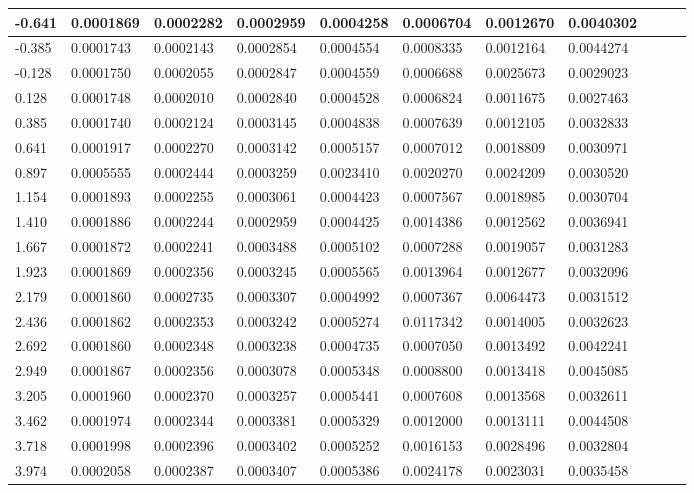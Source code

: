 \documentclass{article}
\begin{document}
\begin{table}[H]
\begin{adjustwidth}{-0.5in}{-.7in}
\begin{tabular}{|l|l|l|l|l|l|l|l|l|l|l|}
-0.641 & 0.0001869 & 0.0002282 & 0.0002959 & 0.0004258 & 0.0006704 & 0.0012670 & 0.0040302 \\ \hline
-0.385 & 0.0001743 & 0.0002143 & 0.0002854 & 0.0004554 & 0.0008335 & 0.0012164 & 0.0044274 \\ \hline
-0.128 & 0.0001750 & 0.0002055 & 0.0002847 & 0.0004559 & 0.0006688 & 0.0025673 & 0.0029023 \\ \hline
0.128 & 0.0001748 & 0.0002010 & 0.0002840 & 0.0004528 & 0.0006824 & 0.0011675 & 0.0027463 \\ \hline
0.385 & 0.0001740 & 0.0002124 & 0.0003145 & 0.0004838 & 0.0007639 & 0.0012105 & 0.0032833 \\ \hline
0.641 & 0.0001917 & 0.0002270 & 0.0003142 & 0.0005157 & 0.0007012 & 0.0018809 & 0.0030971 \\ \hline
0.897 & 0.0005555 & 0.0002444 & 0.0003259 & 0.0023410 & 0.0020270 & 0.0024209 & 0.0030520 \\ \hline
1.154 & 0.0001893 & 0.0002255 & 0.0003061 & 0.0004423 & 0.0007567 & 0.0018985 & 0.0030704 \\ \hline
1.410 & 0.0001886 & 0.0002244 & 0.0002959 & 0.0004425 & 0.0014386 & 0.0012562 & 0.0036941 \\ \hline
1.667 & 0.0001872 & 0.0002241 & 0.0003488 & 0.0005102 & 0.0007288 & 0.0019057 & 0.0031283 \\ \hline
1.923 & 0.0001869 & 0.0002356 & 0.0003245 & 0.0005565 & 0.0013964 & 0.0012677 & 0.0032096 \\ \hline
2.179 & 0.0001860 & 0.0002735 & 0.0003307 & 0.0004992 & 0.0007367 & 0.0064473 & 0.0031512 \\ \hline
2.436 & 0.0001862 & 0.0002353 & 0.0003242 & 0.0005274 & 0.0117342 & 0.0014005 & 0.0032623 \\ \hline
2.692 & 0.0001860 & 0.0002348 & 0.0003238 & 0.0004735 & 0.0007050 & 0.0013492 & 0.0042241 \\ \hline
2.949 & 0.0001867 & 0.0002356 & 0.0003078 & 0.0005348 & 0.0008800 & 0.0013418 & 0.0045085 \\ \hline
3.205 & 0.0001960 & 0.0002370 & 0.0003257 & 0.0005441 & 0.0007608 & 0.0013568 & 0.0032611 \\ \hline
3.462 & 0.0001974 & 0.0002344 & 0.0003381 & 0.0005329 & 0.0012000 & 0.0013111 & 0.0044508 \\ \hline
3.718 & 0.0001998 & 0.0002396 & 0.0003402 & 0.0005252 & 0.0016153 & 0.0028496 & 0.0032804 \\ \hline
3.974 & 0.0002058 & 0.0002387 & 0.0003407 & 0.0005386 & 0.0024178 & 0.0023031 & 0.0035458 \\ \hline

\end{tabular}
\end{adjustwidth}
\end{table}
\end{document}
